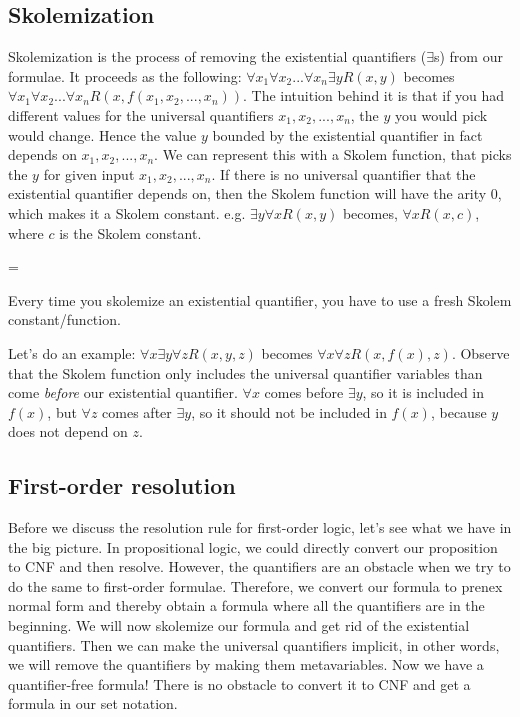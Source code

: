 \documentclass[10pt]{article}
\newenvironment{warning}
  {\par\begin{mdframed}[linewidth=1pt,linecolor=black]%
    \begin{list}{}{\leftmargin=1cm
                   \labelwidth=\leftmargin}\item[\Large\ding{43}]}
  {\end{list}\end{mdframed}\par}
\begin{document}
\subsection{Skolemization}

Skolemization is the process of removing the existential quantifiers ($\exists$s) from our formulae. It proceeds as the following: $\forall x_1 \forall x_2 ... \forall x_n \exists y R(x,y)$ becomes $\forall x_1 \forall x_2 ... \forall x_n R(x, f(x_1, x_2, ..., x_n))$. The intuition behind it is that if you had different values for the universal quantifiers $x_1, x_2, ..., x_n$, the $y$ you would pick would change. Hence the value $y$ bounded by the existential quantifier in fact depends on $x_1, x_2, ..., x_n$. We can represent this with a Skolem function, that picks the $y$ for given input $x_1, x_2, ..., x_n$. If there is no universal quantifier that the existential quantifier depends on, then the Skolem function will have the arity 0, which makes it a Skolem constant. e.g. $\exists y \forall x R(x,y)$ becomes, $\forall x R(x,c)$, where $c$ is the Skolem constant.
\begin{warning}
Every time you skolemize an existential quantifier, you have to use a fresh Skolem constant/function.
\end{warning}
Let's do an example: $\forall x \exists y \forall z R(x,y,z)$ becomes $\forall x \forall z R(x, f(x), z)$. Observe that the Skolem function only includes the universal quantifier variables than come \emph{before} our existential quantifier. $\forall x$ comes before $\exists y$, so it is included in $f(x)$, but $\forall z$ comes after $\exists y$, so it should not be included in $f(x)$, because $y$ does not depend on $z$.

\subsection{First-order resolution}

Before we discuss the resolution rule for first-order logic, let's see what we have in the big picture. In propositional logic, we could directly convert our proposition to CNF and then resolve. However, the quantifiers are an obstacle when we try to do the same to first-order formulae. Therefore, we convert our formula to prenex normal form and thereby obtain a formula where all the quantifiers are in the beginning. We will now skolemize our formula and get rid of the existential quantifiers. Then we can make the universal quantifiers implicit, in other words, we will remove the quantifiers by making them metavariables. Now we have a quantifier-free formula! There is no obstacle to convert it to CNF and get a formula in our set notation.
\end{document}
